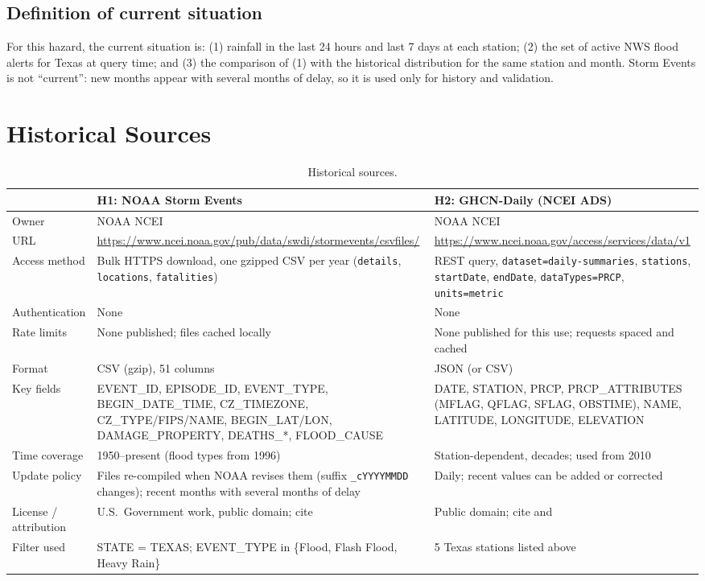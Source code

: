 \documentclass[11pt,letterpaper]{article}
\begin{document}
\subsection{Definition of current situation}
For this hazard, the current situation is: (1) rainfall in the last 24 hours and last 7 days at each station; (2) the set of active NWS flood alerts for Texas at query time; and (3) the comparison of (1) with the historical distribution for the same station and month. Storm Events is not ``current'': new months appear with several months of delay, so it is used only for history and validation.

\section{Historical Sources}

\begin{table}[H]\centering\small
\caption{Historical sources.}\label{tab:hist}
\begin{tabular}{@{}p{3cm}p{6cm}p{6cm}@{}}\toprule
 & \textbf{H1: NOAA Storm Events} & \textbf{H2: GHCN-Daily (NCEI ADS)}\\\midrule
Owner & NOAA NCEI & NOAA NCEI \\
URL & \url{https://www.ncei.noaa.gov/pub/data/swdi/stormevents/csvfiles/} & \url{https://www.ncei.noaa.gov/access/services/data/v1} \\
Access method & Bulk HTTPS download, one gzipped CSV per year (\texttt{details}, \texttt{locations}, \texttt{fatalities}) & REST query, \texttt{dataset=daily-summaries}, \texttt{stations}, \texttt{startDate}, \texttt{endDate}, \texttt{dataTypes=PRCP}, \texttt{units=metric} \\
Authentication & None & None \\
Rate limits & None published; files cached locally & None published for this use; requests spaced and cached \\
Format & CSV (gzip), 51 columns & JSON (or CSV) \\
Key fields & EVENT\_ID, EPISODE\_ID, EVENT\_TYPE, BEGIN\_DATE\_TIME, CZ\_TIMEZONE, CZ\_TYPE/FIPS/NAME, BEGIN\_LAT/LON, DAMAGE\_PROPERTY, DEATHS\_*, FLOOD\_CAUSE & DATE, STATION, PRCP, PRCP\_ATTRIBUTES (MFLAG, QFLAG, SFLAG, OBSTIME), NAME, LATITUDE, LONGITUDE, ELEVATION \\
Time coverage & 1950--present (flood types from 1996) & Station-dependent, decades; used from 2010 \\
Update policy & Files re-compiled when NOAA revises them (suffix \texttt{\_cYYYYMMDD} changes); recent months with several months of delay & Daily; recent values can be added or corrected \\
License / attribution & U.S.\ Government work, public domain; cite \citet{ncei_stormevents} & Public domain; cite \citet{menne2012ghcnd} and \citet{ncei_ads} \\
Filter used & STATE = TEXAS; EVENT\_TYPE in \{Flood, Flash Flood, Heavy Rain\} & 5 Texas stations listed above \\
\bottomrule\end{tabular}
\end{table}
\end{document}
